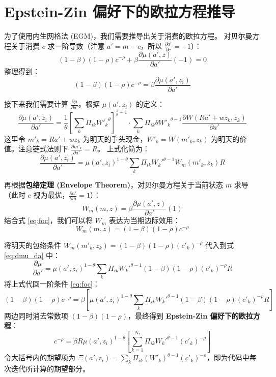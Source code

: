 \documentclass[UTF8,a4paper,12pt]{ctexart}
\begin{document}
\section{Epstein-Zin 偏好下的欧拉方程推导}

为了使用内生网格法 (EGM)，我们需要推导出关于消费的欧拉方程。
对贝尔曼方程关于消费 $c$ 求一阶导数（注意 $a' = m - c$，所以 $\frac{\partial a'}{\partial c} = -1$）：
\[
    (1-\beta)(1-\rho) c^{-\rho} + \beta \frac{\partial \mu(a', z)}{\partial a'} (-1) = 0
\]
整理得到：
\begin{equation}
    (1-\beta)(1-\rho) c^{-\rho} = \beta \frac{\partial \mu(a', z_i)}{\partial a'} \label{eq:foc}
\end{equation}

接下来我们需要计算 $\frac{\partial \mu}{\partial a'}$。根据 $\mu(a', z_i)$ 的定义：
\[
    \frac{\partial \mu(a', z_i)}{\partial a'}
    =
    \frac{1}{\theta} \left[ \sum_{k} \Pi_{ik} {W'_{k}}^{\theta} \right]^{\frac{1}{\theta}-1} 
    \cdot \sum_{k} \Pi_{ik} \theta {W'_{k}}^{\theta-1} \frac{\partial W(R a' + w z_k, z_k)}{\partial a'}
\]
这里令 $m'_k = R a' + w z_k$ 为明天的手头现金，$W'_k = W(m'_k, z_k)$ 为明天的价值。注意链式法则下 $\frac{\partial m'_k}{\partial a'} = R$。
上式化简为：
\begin{equation}
    \frac{\partial \mu(a', z_i)}{\partial a'} = \mu(a', z_i)^{1-\theta} \sum_{k} \Pi_{ik} {W_k'}^{\theta-1} W_m(m'_k, z_k) R \label{eq:dmu_da}
\end{equation}

再根据\textbf{包络定理 (Envelope Theorem)}，对贝尔曼方程关于当前状态 $m$ 求导（此时 $c$ 视为最优，$\frac{\partial a'}{\partial m} = 1$）：
\[
    W_m(m, z) = \beta \frac{\partial \mu(a', z)}{\partial a'} (1)
\]
结合式 \eqref{eq:foc}，我们可以将 $W_m$ 表达为当期边际效用：
\begin{equation}
    W_m(m, z) = (1-\beta)(1-\rho) c^{-\rho} \label{eq:envelope}
\end{equation}

将明天的包络条件 $W_m(m'_k, z_k) = (1-\beta)(1-\rho) (c'_k)^{-\rho}$ 代入到式 \eqref{eq:dmu_da} 中：
\[
    \frac{\partial \mu}{\partial a'} = \mu(a', z_i)^{1-\theta} \sum_{k} \Pi_{ik} {W_k'}^{\theta-1} (1-\beta)(1-\rho) (c'_k)^{-\rho} R
\]
将上式代回一阶条件 \eqref{eq:foc}：
\[
    (1-\beta)(1-\rho) c^{-\rho} = \beta \left[ \mu(a', z_i)^{1-\theta} \sum_{k} \Pi_{ik} {W_k'}^{\theta-1} (1-\beta)(1-\rho) (c'_k)^{-\rho} R \right]
\]
两边同时消去常数项 $(1-\beta)(1-\rho)$，最终得到 \textbf{Epstein-Zin 偏好下的欧拉方程}：
\begin{equation}
    c^{-\rho} = \beta R \mu(a', z_i)^{1-\theta} \left[ \sum_{k=1}^{N_z} \Pi_{ik} {W_k'}^{\theta-1} (c'_k)^{-\rho} \right] \label{eq:euler}
\end{equation}
令大括号内的期望项为 $\Xi(a',z_i) = \sum_{k} \Pi_{ik} (W'_k)^{\theta-1} (c'_k)^{-\rho}$，即为代码中每次迭代所计算的期望部分。
\end{document}

